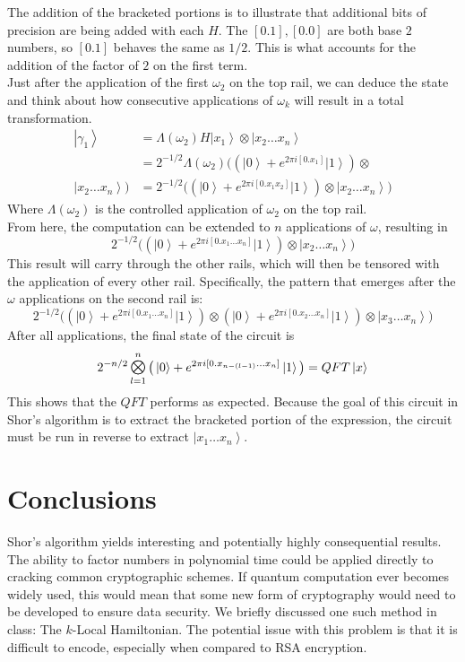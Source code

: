 \documentclass{exam} %
\theoremstyle{plain}
\theoremstyle{definition}
\theoremstyle{remark}
\numberwithin{equation}{section}  %
\newcommand{\ket}[1]{ \left| #1 \right> }
\DeclareMathOperator*{\Motimes}{\text{\raisebox{0.25ex}{\scalebox{0.8}{$\bigotimes$}}}}
\begin{document}
\begin{enumerate}
  The addition of the bracketed portions is to illustrate that additional bits of
  precision are being added with each $H$. The $[0.1], [0.0]$ are both base $2$ numbers,
  so $[0.1]$ behaves the same as $1/2$. This is what accounts for the addition of the 
  factor of $2$ on the first term. \\

  Just after the application of the first $\omega_2$ on the top rail, we can
  deduce the state and think about how consecutive applications of $\omega_k$ will
  result in a total transformation.\\
  \begin{align*}
    \ket{\gamma_1} 
    &= \Lambda(\omega_2) H\ket{x_1}\otimes\ket{x_2\hdots x_n}\\
    &= 2^{-1/2}\Lambda(\omega_2)\big((\ket{0}+e^{2\pi i[0.x_1]}\ket{1}) \otimes \\
    \ket{x_2\hdots x_n}\big)
    &= 2^{-1/2}\big((\ket{0}+e^{2\pi i[0.x_1x_2]}\ket{1}) \otimes 
    \ket{x_2\hdots x_n}\big)
  \end{align*}
  Where $\Lambda(\omega_2)$ is the controlled application of $\omega_2$ on the top rail.\\

  From here, the computation can be extended to $n$ applications of $\omega$, resulting in
  \[
    2^{-1/2}\big((\ket{0}+e^{2\pi i[0.x_1\hdots x_n]}\ket{1}) \otimes 
    \ket{x_2\hdots x_n}\big)
  \]
  This result will carry through the other rails, which will then be tensored with the 
  application of every other rail. Specifically, the pattern that emerges after the
  $\omega$ applications on the second rail is:
  \[
    2^{-1/2}\big((\ket{0}+e^{2\pi i[0.x_1\hdots x_n]}\ket{1}) \otimes 
    (\ket{0}+e^{2\pi i[0.x_2\hdots x_n]}\ket{1})\otimes\ket{x_3\hdots x_n} \big)
  \]
  After all applications, the final state of the circuit is
  \[
    2^{-n/2} 
    \Motimes_{l=1}^{n}
    \big(
    \ket{0} + e^{2 \pi i[0.x_{n-(l-1)}\hdots x_n]}\ket{1}
    \big) = QFT\ket{x}
  \]
  This shows that the $QFT$ performs as expected. Because the goal of this circuit in
  Shor's
  algorithm is to extract the bracketed portion of the expression, the circuit must be run
  in reverse to extract $\ket{x_1\hdots x_n}$.
\end{enumerate}
\section{Conclusions}
Shor's algorithm yields interesting and potentially highly consequential results.
The ability to factor numbers in polynomial time could be applied directly 
to cracking common cryptographic schemes. If quantum computation ever becomes
widely used, this would mean that some new form of cryptography would need to be
developed to ensure data security. We briefly discussed one such method in class:
The $k$-Local Hamiltonian. The potential issue with this problem is that it is
difficult to encode, especially when compared to RSA encryption. \\
\end{document}
